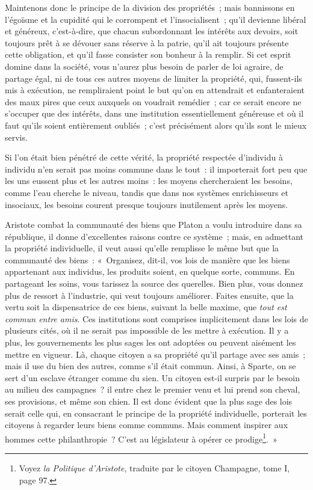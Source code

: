 \documentclass[french,twoside]{book} %
\newcommand\chapterclose{} %
\begin{document}
Maintenons donc le principe de la division des propriétés ; mais bannissons en l’égoïsme et la cupidité qui le corrompent et l’insocialisent ; qu’il devienne libéral et généreux, c’est-à-dire, que chacun subordonnant les intérêts aux devoirs, soit toujours prêt à se dévouer sans réserve à la patrie, qu’il ait toujours présente cette obligation, et qu’il fasse consister son bonheur à la remplir. Si cet esprit domine dans la société, vous n’aurez plus besoin de parler de loi agraire, de partage égal, ni de tous ces autres moyens de limiter la propriété, qui, fussent-ils mis à exécution, ne rempliraient point le but qu’on en attendrait et enfanteraient des maux pires que ceux auxquels on voudrait remédier ; car ce serait encore ne s’occuper que des intérêts, dans une institution essentiellement généreuse et où il faut qu’ils soient entièrement oubliés ; c’est précisément alors qu’ils sont le mieux servis.\par
Si l’on était bien pénétré de cette vérité, la propriété respectée d’individu à individu n’en serait pas moins commune dans le tout : il importerait fort peu que les uns eussent plus et les autres moins : les moyens chercheraient les besoins, comme l’eau cherche le niveau, tandis que dans nos systèmes enrichisseurs et insociaux, les besoins courent presque toujours inutilement après les moyens.\par
Aristote combat la communauté des biens que Platon a voulu introduire dans sa république, il donne d’excellentes raisons contre ce système ; mais, en admettant la propriété individuelle, il veut aussi qu’elle remplisse le même but que la communauté des biens : « Organisez, dit-il, vos lois de manière que les biens appartenant aux individus, les produits soient, en quelque sorte, communs. En partageant les soins, vous tarissez la source des querelles. Bien plus, vous donnez plus de ressort à l’industrie, qui veut toujours améliorer. Faites ensuite, que la vertu soit la dispensatrice de ces biens, suivant la belle maxime, que {\itshape tout est commun entre amis}. Ces institutions sont comprises implicitement dans les lois de plusieurs cités, où il ne serait pas impossible de les mettre à exécution. Il y a plus, les gouvernements les plus sages les ont adoptées ou peuvent aisément les mettre en vigueur. Là, chaque citoyen a sa propriété qu’il partage avec ses amis ; mais il use du bien des autres, comme s’il était commun. Ainsi, à Sparte, on se sert d’un esclave étranger comme du sien. Un citoyen est-il surpris par le besoin au milieu des campagnes ? il entre chez le premier venu et lui prend son cheval, ses provisions, et même son chien. Il est donc évident que la plus sage des lois serait celle qui, en consacrant le principe de la propriété individuelle, porterait les citoyens à regarder leurs biens comme communs. Mais comment inspirer aux hommes cette philanthropie ? C’est au législateur à opérer ce prodige\footnote{Voyez {\itshape la Politique d’Aristote}, traduite par le citoyen Champagne, tome I, page 97.}. »
\chapterclose
\end{document}
